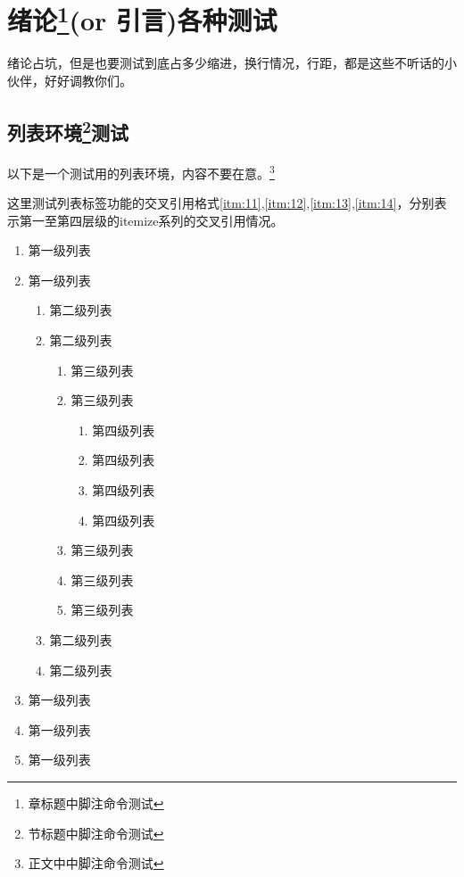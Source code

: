 \chapter{绪论\footnote{章标题中脚注命令测试}(or 引言)各种测试}
绪论占坑，但是也要测试到底占多少缩进，换行情况，行距，都是这些不听话的小伙伴，好好调教你们。

\section{列表环境\footnote{节标题中脚注命令测试}测试}
以下是一个测试用的列表环境，内容不要在意。\footnote{正文中中脚注命令测试}

这里测试列表标签功能的交叉引用格式\ref{itm:11},\ref{itm:12},\ref{itm:13},\ref{itm:14}，分别表示第一至第四层级的itemize系列的交叉引用情况。
\begin{enumerate}
	\item 第一级列表\label{itm:11}
	\item 第一级列表
	\begin{enumerate}
		\item 第二级列表\label{itm:12}
		\item 第二级列表
		\begin{enumerate}
			\item 第三级列表\label{itm:13}
			\item 第三级列表
			\begin{enumerate}
				\item 第四级列表\label{itm:14}
				\item 第四级列表
				\item 第四级列表
				\item 第四级列表
			\end{enumerate}
			\item 第三级列表
			\item 第三级列表
			\item 第三级列表
		\end{enumerate}
		\item 第二级列表
		\item 第二级列表
	\end{enumerate}
	\item 第一级列表
	\item 第一级列表
	\item 第一级列表
\end{enumerate}


